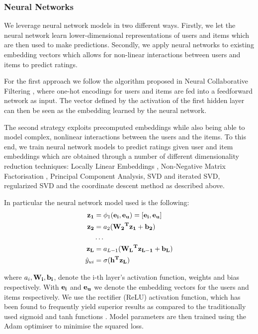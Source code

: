 \documentclass[10pt,conference,compsocconf]{IEEEtran}
\begin{document}
\subsubsection{Neural Networks}
We leverage neural network models in two different ways. Firstly, we let the neural network learn lower-dimensional representations of users and items which are then used to make predictions. 
Secondly, we apply neural networks to existing embedding vectors which allows for non-linear interactions between users and items to predict ratings. 

For the first approach we follow the algorithm proposed in Neural Collaborative Filtering \cite{he2017neural}, where one-hot encodings for users and items are fed into a feedforward network as input. The vector defined by the activation of the first hidden layer can then be seen as the embedding learned by the neural network.  

The second strategy exploits precomputed embeddings while also being able to model complex, nonlinear interactions  between the users and the items. 
To this end, we train neural network models to predict ratings given user and item embeddings which are obtained through a number of different dimensionality reduction techniques: Locally Linear Embeddings \cite{roweis2000nonlinear}, Non-Negative Matrix Factorisation \cite{cichocki2009fast}, Principal Component Analysis, SVD and iterated SVD, regularized SVD and the coordinate descent method as described above.

In particular the neural network model used is the following:
\begin{equation}
\begin{aligned}
    \bf{z_1} &= \phi_1(\bf{e_i}, \bf{e_u}) = [\bf{e_i}, \bf{e_u}]\\
    \bf{z_2} &= a_2(\bf{W_2}^T \bf{z_1} + b_2) \\
    &\dots \\
    \bf{z_L} &= a_{L - 1 }(\bf{W_{L}}^T \bf{z_{L - 1}} + b_L) \\
    \hat y_{ui} &= \sigma(\bf{h}^T \bf{z_L})
\end{aligned}
\end{equation}

where $a_i,\bf{W_i}, \bf{b_i}$, denote the i-th layer's activation function, weights and bias respectively. With $\bf{e_i}$ and $\bf{e_u}$ we denote the embedding vectors for the users and items respectively. We use the rectifier (ReLU) activation function, which has been found to frequently yield superior results as compared to the traditionally used sigmoid and tanh functions \cite{glorot2011deep}.
Model parameters are then trained using the Adam optimiser \cite{kingma2014adam} to minimise the squared loss.
 
\end{document}
